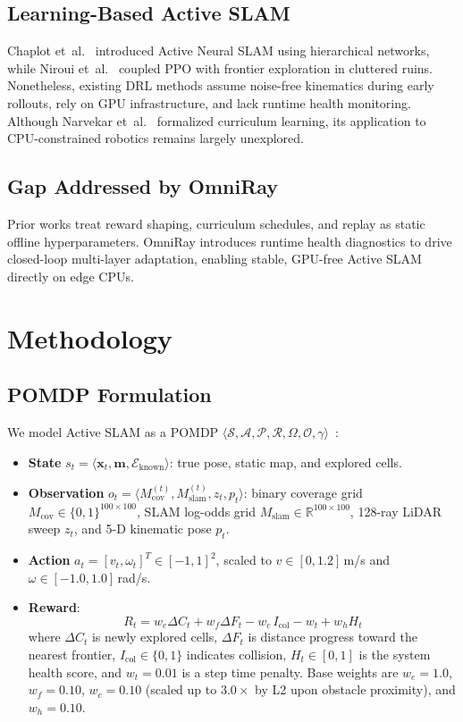 \documentclass[conference]{IEEEtran}
\begin{document}
\subsection{Learning-Based Active SLAM}
Chaplot et~al.~\cite{chaplot2020} introduced Active Neural SLAM using hierarchical networks, while Niroui et~al.~\cite{niroui2019} coupled PPO with frontier exploration in cluttered ruins. Nonetheless, existing DRL methods assume noise-free kinematics during early rollouts, rely on GPU infrastructure, and lack runtime health monitoring. Although Narvekar et~al.~\cite{narvekar2020} formalized curriculum learning, its application to CPU-constrained robotics remains largely unexplored.

\subsection{Gap Addressed by OmniRay}
Prior works treat reward shaping, curriculum schedules, and replay as static offline hyperparameters. OmniRay introduces runtime health diagnostics to drive closed-loop multi-layer adaptation, enabling stable, GPU-free Active SLAM directly on edge CPUs.

\section{Methodology}

\subsection{POMDP Formulation}
We model Active SLAM as a POMDP $\langle \mathcal{S}, \mathcal{A}, \mathcal{P}, \mathcal{R}, \Omega, \mathcal{O}, \gamma \rangle$~\cite{kaelbling1998}:
\begin{itemize}
    \item \textbf{State} $s_t = \langle \mathbf{x}_t, \mathbf{m}, \mathcal{E}_{\text{known}} \rangle$: true pose, static map, and explored cells.
    \item \textbf{Observation} $o_t = \langle M_{\text{cov}}^{(t)}, M_{\text{slam}}^{(t)}, z_t, p_t \rangle$: binary coverage grid $M_{\text{cov}} \in \{0,1\}^{100\times100}$, SLAM log-odds grid $M_{\text{slam}} \in \mathbb{R}^{100\times100}$, 128-ray LiDAR sweep $z_t$, and 5-D kinematic pose $p_t$.
    \item \textbf{Action} $a_t = [v_t, \omega_t]^T \in [-1, 1]^2$, scaled to $v \in [0, 1.2]$\,m/s and $\omega \in [-1.0, 1.0]$\,rad/s.
    \item \textbf{Reward}:
    \begin{equation}
    \label{eq:reward}
    R_t = w_e \Delta C_t + w_f \Delta F_t - w_c\, I_{\text{col}} - w_t + w_h H_t
    \end{equation}
    where $\Delta C_t$ is newly explored cells, $\Delta F_t$ is distance progress toward the nearest frontier, $I_{\text{col}} \in \{0, 1\}$ indicates collision, $H_t \in [0, 1]$ is the system health score, and $w_t = 0.01$ is a step time penalty. Base weights are $w_e = 1.0$, $w_f = 0.10$, $w_c = 0.10$ (scaled up to $3.0\times$ by L2 upon obstacle proximity), and $w_h = 0.10$.
\end{itemize}
\end{document}
